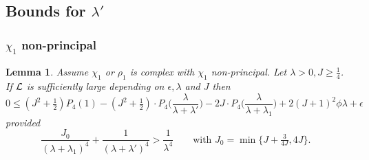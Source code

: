 \documentclass[12pt,psamsfonts]{amsart}
\newtheorem{lem}[thm]{Lemma}
\theoremstyle{definition}
\theoremstyle{remark}
\numberwithin{equation}{section}
\begin{document}
\subsection{Bounds for $\lambda'$} \label{CC-BoundsLp}


\subsubsection{$\chi_1$ non-principal} 
\begin{lem} \label{CC-L1LpIdentity} Assume $\chi_1$ or $\rho_1$ is complex with $\chi_1$ non-principal. Let  $\lambda > 0, J \geq \tfrac{1}{4}$. If $\mathcal{L}$ is sufficiently large depending on $\epsilon, \lambda$ and $J$ then
\[
0 \leq  (J^2+\tfrac{1}{2}) P_4(1) -  (J^2+\tfrac{1}{2}) \cdot P_4\big( \frac{\lambda}{\lambda+\lambda'} \big) - 2J \cdot P_4\big( \frac{\lambda}{\lambda+\lambda_1}\big)  + 2(J+1)^2 \phi \lambda + \epsilon
\]
provided
\begin{equation}
	\frac{ J_0}{(\lambda+\lambda_1)^4} + \frac{1}{(\lambda+\lambda')^4} > \frac{1}{\lambda^4} \qquad \text{with $J_0 = \min\{ J+\tfrac{3}{4J}, 4J \}.$ }
 \label{CC-L1LpIdentity-Condition}
\end{equation}
\end{lem}
\end{document}
